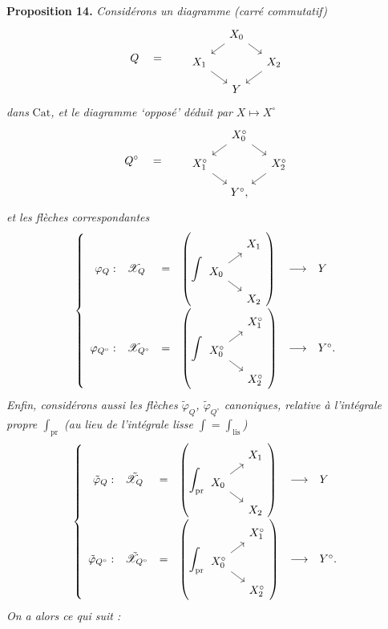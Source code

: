 \documentclass[11pt]{article}
\newcommand{\printedpage}[1]{\marginpar{\footnotesize p.~#1}}
\newcommand{\msp}[1]{\marginpar{\footnotesize [#1]}}
\newcommand{\Cat}{\mathrm{Cat}}
\newcommand{\sX}{\mathscr{X}}
\newcommand{\tsX}{\tilde{\mathscr{X}}}
\begin{document}
\textbf{Proposition 14.} \textit{Considérons un diagramme (carré commutatif)}
\[
Q \quad = \qquad
\begin{tikzcd}[row sep=small, column sep=small]
 & X_0 \arrow[dl] \arrow[dr] & \\
X_1 \arrow[dr] & & X_2 \arrow[dl] \\
 & Y &
\end{tikzcd}
\]
\textit{dans} $\Cat$\textit{, et le diagramme `opposé' déduit par} $X\longmapsto X^\circ$
\[
Q^\circ \quad = \qquad
\begin{tikzcd}[row sep=small, column sep=small]
 & X_0^\circ \arrow[dl] \arrow[dr] & \\
X_1^\circ \arrow[dr] & & X_2^\circ \arrow[dl] \\
 & Y^\circ, &
\end{tikzcd}
\]
\msp{page 141}
\textit{et les flèches correspondantes}
\[
\left\{
\begin{array}{rlclcl}
\varphi_Q : & \sX_Q & = &
\left(\displaystyle\int
\begin{tikzcd}[ampersand replacement=\&, row sep=small, column sep=small]
 \& X_1 \\
X_0 \arrow[ur] \arrow[dr] \& \\
 \& X_2
\end{tikzcd}
\right)
& \longrightarrow & Y \\[2ex]
\varphi_{Q^\circ} : & \sX_{Q^\circ} & = &
\left(\displaystyle\int
\begin{tikzcd}[ampersand replacement=\&, row sep=small, column sep=small]
 \& X_1^\circ \\
X_0^\circ \arrow[ur] \arrow[dr] \& \\
 \& X_2^\circ
\end{tikzcd}
\right)
& \longrightarrow & Y^\circ.
\end{array}
\right.
\]
\textit{Enfin, considérons aussi les flèches $\tilde{\varphi}_Q$, $\tilde{\varphi}_{Q^\circ}$ canoniques, relative à l'intégrale propre $\int_{\mathrm{pr}}$} %
\printedpage{97}
\textit{(au lieu de l'intégrale lisse $\int=\int_{\mathrm{lis}}$)}
\[
\left\{
\begin{array}{rlclcl}
\tilde{\varphi}_Q : & \tsX_Q & = &
\left(\displaystyle\int_{\mathrm{pr}}
\begin{tikzcd}[ampersand replacement=\&, row sep=small, column sep=small]
 \& X_1 \\
X_0 \arrow[ur] \arrow[dr] \& \\
 \& X_2
\end{tikzcd}
\right)
& \longrightarrow & Y \\[2ex]
\tilde{\varphi}_{Q^\circ} : & \tsX_{Q^\circ} & = &
\left(\displaystyle\int_{\mathrm{pr}}
\begin{tikzcd}[ampersand replacement=\&, row sep=small, column sep=small]
 \& X_1^\circ \\
X_0^\circ \arrow[ur] \arrow[dr] \& \\
 \& X_2^\circ
\end{tikzcd}
\right)
& \longrightarrow & Y^\circ.
\end{array}
\right.
\]
\textit{On a alors ce qui suit :}
\end{document}

